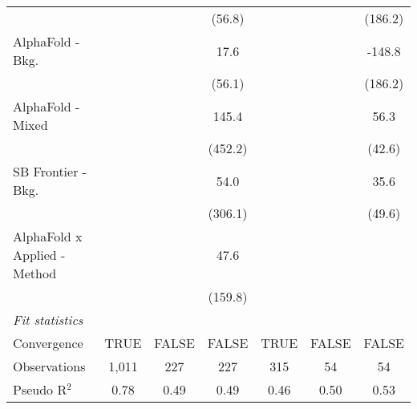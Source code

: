 \begin{tabular}{lcccccc}
                                &         &               & (56.8)  &              &              & (186.2)\\   
   AlphaFold - Bkg.             &         &               & 17.6    &              &              & -148.8\\   
                                &         &               & (56.1)  &              &              & (186.2)\\   
   AlphaFold - Mixed            &         &               & 145.4   &              &              & 56.3\\   
                                &         &               & (452.2) &              &              & (42.6)\\   
   SB Frontier - Bkg.           &         &               & 54.0    &              &              & 35.6\\   
                                &         &               & (306.1) &              &              & (49.6)\\   
   AlphaFold x Applied - Method &         &               & 47.6    &              &              &   \\   
                                &         &               & (159.8) &              &              &   \\   
   \midrule
   \emph{Fit statistics}\\
   Convergence                  &TRUE     & FALSE         & FALSE   & TRUE         & FALSE        & FALSE\\  
   Observations                 & 1,011   & 227           & 227     & 315          & 54           & 54\\  
   Pseudo R$^2$                 & 0.78    & 0.49          & 0.49    & 0.46         & 0.50         & 0.53\\  
   

\end{tabular}
